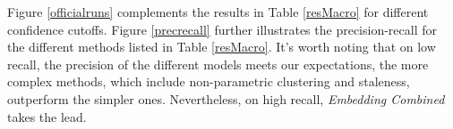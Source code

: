 \documentclass{article}
\begin{document}
{{Figure \ref{officialruns} complements the results in Table \ref{resMacro} for different confidence cutoffs. %
Figure \ref{precrecall} further illustrates the precision-recall for the different methods listed in Table \ref{resMacro}. It's worth noting that on low recall, the precision of the different models meets our expectations, the more complex methods, which include non-parametric clustering and staleness, outperform the simpler ones. Nevertheless, on high recall, {\textit{Embedding Combined}} takes the lead.



}}
\end{document}
